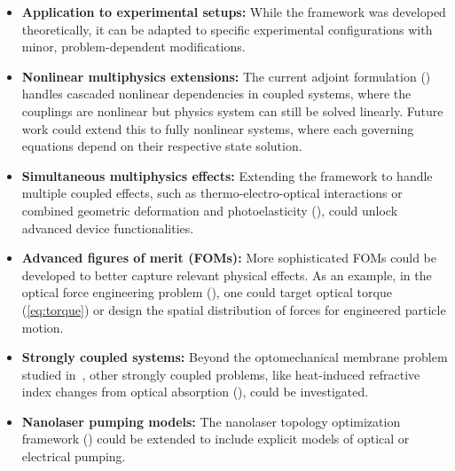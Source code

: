 \begin{itemize}
    \item \textbf{Application to experimental setups:} While the framework was developed theoretically, it can be adapted to specific experimental configurations with minor, problem-dependent modifications.
    
    \item \textbf{Nonlinear multiphysics extensions:} The current adjoint formulation () handles cascaded nonlinear dependencies in coupled systems, where the couplings are nonlinear but physics system can still be solved linearly. Future work could extend this to fully nonlinear systems, where each governing equations depend on their respective state solution.
    
    \item \textbf{Simultaneous multiphysics effects:} Extending the framework to handle multiple coupled effects, such as thermo-electro-optical interactions or combined geometric deformation and photoelasticity (), could unlock advanced device functionalities.
    
    \item \textbf{Advanced figures of merit (FOMs):} More sophisticated FOMs could be developed to better capture relevant physical effects. As an example, in the optical force engineering problem (), one could target optical torque (\eqref{eq:torque}) or design the spatial distribution of forces for engineered particle motion.
    
    \item \textbf{Strongly coupled systems:} Beyond the optomechanical membrane problem studied in~, other strongly coupled problems, like heat-induced refractive index changes from optical absorption (), could be investigated.
    
    \item \textbf{Nanolaser pumping models:} The nanolaser topology optimization framework () could be extended to include explicit models of optical or electrical pumping.
\end{itemize}